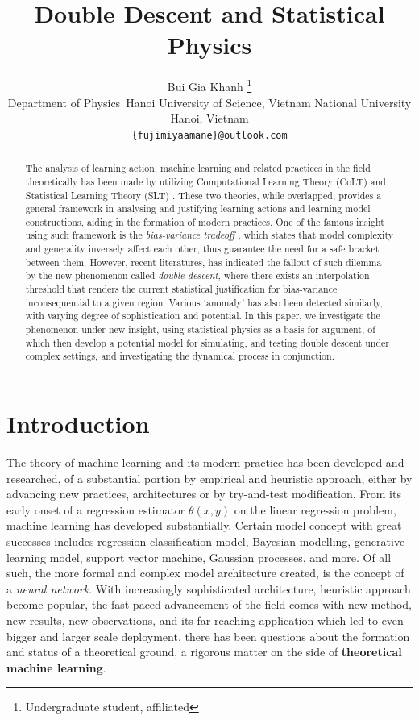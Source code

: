 \documentclass[10pt]{article} %
\title{Double Descent and Statistical Physics}
\author{Bui Gia Khanh \thanks{Undergraduate student, affiliated} \\
Department of Physics\
Hanoi University of Science, Vietnam National University\\
Hanoi, Vietnam\\
\texttt{\{fujimiyaamane\}@outlook.com} \\
}
\begin{document}
\maketitle

\begin{abstract}
       The analysis of learning action, machine learning and related practices in the field theoretically has been made by utilizing Computational Learning Theory (CoLT) \cite{10.1145/1968.1972} and Statistical Learning Theory (SLT) \cite{Vapnik1999-VAPTNO}. These two theories, while overlapped, provides a general framework in analysing and justifying learning actions and learning model constructions, aiding in the formation of modern practices. One of the famous insight using such framework is the \textit{bias-variance tradeoff} \cite{6797087}, which states that model complexity and generality inversely affect each other, thus guarantee the need for a safe bracket between them. However, recent literatures, \cite{belkin_reconciling_2019} has indicated the fallout of such dilemma by the new phenomenon called \textit{double descent}, where there exists an interpolation threshold that renders the current statistical justification for bias-variance inconsequential to a given region. Various `anomaly' has also been detected similarly, with varying degree of sophistication and potential. In this paper, we investigate the phenomenon under new insight, using statistical physics as a basis for argument, of which then develop a potential model for simulating, and testing double descent under complex settings, and investigating the dynamical process in conjunction.  
\end{abstract}

\section{Introduction}

The theory of machine learning and its modern practice has been developed and researched, of a substantial portion by empirical and heuristic approach, either by advancing new practices, architectures or by try-and-test modification. From its early onset of a regression estimator $\theta(x,y)$ on the linear regression problem, machine learning has developed substantially. Certain model concept with great successes includes regression-classification model, Bayesian modelling, generative learning model, support vector machine, Gaussian processes, and more. Of all such, the more formal and complex model architecture created, is the concept of a \textit{neural network}. With increasingly sophisticated architecture, heuristic approach become popular, the fast-paced advancement of the field comes with new method, new results, new observations, and its far-reaching application which led to even bigger and larger scale deployment, there has been questions about the formation and status of a theoretical ground, a rigorous matter on the side of \textbf{theoretical machine learning}.
\end{document}
